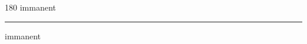 
\begin{frame}
\begin{center}
\begin{turn}{180}
{\fontsize{2.5cm}{1em}\selectfont immanent}
\end{turn}
\vspace{1em}\par  
\hrule
\vspace{1em}\par  
{\fontsize{2.5cm}{1em}\selectfont immanent}
\end{center}
\end{frame}
